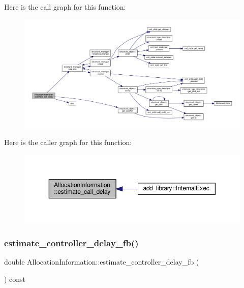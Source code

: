 Here is the call graph for this function\+:
\nopagebreak
\begin{figure}[H]
\begin{center}
\leavevmode
\includegraphics[width=350pt]{d7/d79/classAllocationInformation_a8c3a54df4f2c6858cc39399fdad52bcf_cgraph}
\end{center}
\end{figure}
Here is the caller graph for this function\+:
\nopagebreak
\begin{figure}[H]
\begin{center}
\leavevmode
\includegraphics[width=350pt]{d7/d79/classAllocationInformation_a8c3a54df4f2c6858cc39399fdad52bcf_icgraph}
\end{center}
\end{figure}
\mbox{\label{classAllocationInformation_a0d6e8c03de225226eeadc0ac793e9837}} 
\subsubsection{\texorpdfstring{estimate\+\_\+controller\+\_\+delay\+\_\+fb()}{estimate\_controller\_delay\_fb()}}
{\footnotesize\ttfamily double Allocation\+Information\+::estimate\+\_\+controller\+\_\+delay\+\_\+fb (\begin{DoxyParamCaption}{ }\end{DoxyParamCaption}) const}



